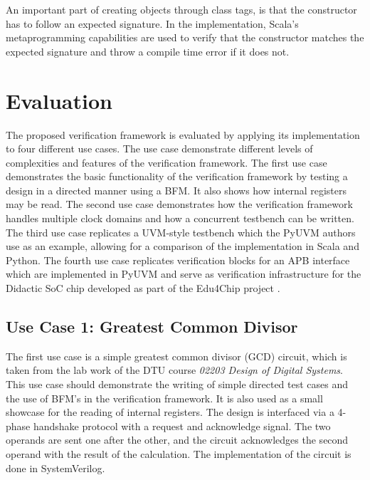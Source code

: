 An important part of creating objects through class tags, is that the constructor has to follow an expected signature. In the implementation, Scala's metaprogramming capabilities are used to verify that the constructor matches the expected signature and throw a compile time error if it does not.

\chapter{Evaluation}

The proposed verification framework is evaluated by applying its implementation to four different use cases. The use
case demonstrate different levels of complexities and features of the verification framework. The first use case
demonstrates the basic functionality of the verification framework by testing a design in a directed manner using a
BFM. It also shows how internal registers may be read. The second use case demonstrates how the verification
framework handles multiple clock domains and how a concurrent testbench can be written. The third use case replicates
a UVM-style testbench which the PyUVM authors use as an example, allowing for a comparison of the implementation in
Scala and Python. The fourth use case replicates verification blocks for an APB interface which are implemented in
PyUVM and serve as verification infrastructure for the Didactic SoC chip developed as part of the
Edu4Chip project \cite{edu4chip}. 

\section{Use Case 1: Greatest Common Divisor} %

The first use case is a simple greatest common divisor (GCD) circuit, which is taken from the lab work of the DTU
course \textit{02203 Design of Digital Systems}. This use case should demonstrate the writing of simple directed test
cases and the use of BFM's in the verification framework. It is also used as a small showcase for the reading of
internal registers. The design is interfaced via a 4-phase handshake protocol with a request and acknowledge signal.
The two operands are sent one after the other, and the circuit acknowledges the second operand with the result of the
calculation. The implementation of the circuit is done in SystemVerilog.

